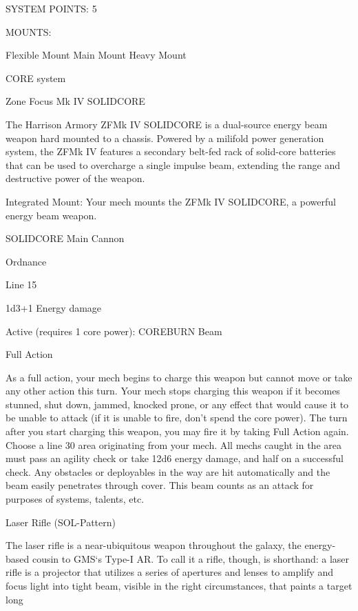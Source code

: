                                             SYSTEM POINTS: 5 

                                                 MOUNTS: 

 Flexible Mount                    Main Mount                            Heavy Mount 

                                               CORE system 

                                                                                                           


                                       Zone Focus Mk IV  SOLIDCORE  

 The Harrison Armory ZFMk IV SOLIDCORE is a dual-source energy beam weapon hard mounted to a  
 chassis. Powered by a milifold power generation system, the ZFMk IV features a secondary belt-fed  
 rack of solid-core batteries that can be used to overcharge a single impulse beam, extending the range  
 and destructive power of the weapon.      

  Integrated Mount: Your mech mounts the ZFMk IV SOLIDCORE, a powerful energy beam weapon.
 
 SOLIDCORE  
  Main Cannon
 
 Ordnance
 
  Line 15
 
  1d3+1 Energy damage
 

 Active (requires 1 core power): COREBURN Beam
 
  Full Action
 
 As a full action, your mech begins to charge this weapon but cannot move or take any other action this  
 turn. Your mech stops charging this weapon if it becomes stunned, shut down, jammed, knocked  
  prone, or any effect that would cause it to be unable to attack (if it is unable to fire, don’t spend the  
 core power). The turn after you start charging this weapon, you may fire it by taking Full Action again.  
 Choose a line 30 area originating from your mech. All mechs caught in the area must pass an agility  
 check or take 12d6 energy damage, and half on a successful check. Any obstacles or deployables in  
 the way are hit automatically and the beam easily penetrates through cover. This beam counts as an  
 attack for purposes of systems, talents, etc. 

Laser Rifle (SOL-Pattern)  

The laser rifle is a near-ubiquitous weapon throughout the galaxy, the energy-based cousin to GMS‘s Type-I  
AR. To call it a rifle, though, is shorthand: a laser rifle is a projector that utilizes a series of apertures and  
lenses to amplify and focus light into tight beam, visible in the right circumstances, that paints a target long  

